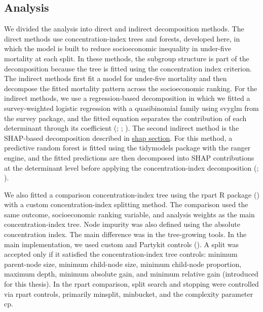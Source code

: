 \documentclass[
  11pt,
  a4paper,
]{article}
\begin{document}
\subsection{Analysis}\label{sec-analysis-methods}

We divided the analysis into direct and indirect decomposition methods.
The direct methods use concentration-index trees and forests, developed
here, in which the model is built to reduce socioeconomic inequality in
under-five mortality at each split. In these methods, the subgroup
structure is part of the decomposition because the tree is fitted using
the concentration index criterion. The indirect methods first fit a
model for under-five mortality and then decompose the fitted mortality
pattern across the socioeconomic ranking. For the indirect methods, we
use a regression-based decomposition in which we fitted a
survey-weighted logistic regression with a quasibinomial family using
svyglm from the survey package, and the fitted equation separates the
contribution of each determinant through its coefficient
(; ; ). The
second indirect method is the SHAP-based decomposition described in
\hyperref[sec-shap-decomposition-definition]{shap section}. For this
method, a predictive random forest is fitted using the tidymodels
package with the ranger engine, and the fitted predictions are then
decomposed into SHAP contributions at the determinant level before
applying the concentration-index decomposition
(;
).

We also fitted a comparison concentration-index tree using the rpart R
package () with a
custom concentration-index splitting method. The comparison used the
same outcome, socioeconomic ranking variable, and analysis weights as
the main concentration-index tree. Node impurity was also defined using
the absolute concentration index. The main difference was in the
tree-growing tools. In the main implementation, we used custom and
Partykit controls (). A split was accepted only if it satisfied the
concentration-index tree controls: minimum parent-node size, minimum
child-node size, minimum child-node proportion, maximum depth, minimum
absolute gain, and minimum relative gain (introduced for this thesis).
In the rpart comparison, split search and stopping were controlled via
rpart controls, primarily minsplit, minbucket, and the complexity
parameter cp.~
\end{document}
